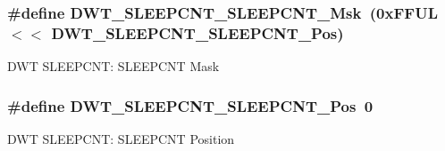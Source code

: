\subsubsection[{\texorpdfstring{D\+W\+T\+\_\+\+S\+L\+E\+E\+P\+C\+N\+T\+\_\+\+S\+L\+E\+E\+P\+C\+N\+T\+\_\+\+Msk}{DWT_SLEEPCNT_SLEEPCNT_Msk}}]{\setlength{\rightskip}{0pt plus 5cm}\#define D\+W\+T\+\_\+\+S\+L\+E\+E\+P\+C\+N\+T\+\_\+\+S\+L\+E\+E\+P\+C\+N\+T\+\_\+\+Msk~(0x\+F\+F\+U\+L $<$$<$ D\+W\+T\+\_\+\+S\+L\+E\+E\+P\+C\+N\+T\+\_\+\+S\+L\+E\+E\+P\+C\+N\+T\+\_\+\+Pos)}\hypertarget{group___c_m_s_i_s___d_w_t_ga1e340751d71413fef400a0a1d76cc828}{}\label{group___c_m_s_i_s___d_w_t_ga1e340751d71413fef400a0a1d76cc828}
D\+WT S\+L\+E\+E\+P\+C\+NT\+: S\+L\+E\+E\+P\+C\+NT Mask 
\subsubsection[{\texorpdfstring{D\+W\+T\+\_\+\+S\+L\+E\+E\+P\+C\+N\+T\+\_\+\+S\+L\+E\+E\+P\+C\+N\+T\+\_\+\+Pos}{DWT_SLEEPCNT_SLEEPCNT_Pos}}]{\setlength{\rightskip}{0pt plus 5cm}\#define D\+W\+T\+\_\+\+S\+L\+E\+E\+P\+C\+N\+T\+\_\+\+S\+L\+E\+E\+P\+C\+N\+T\+\_\+\+Pos~0}\hypertarget{group___c_m_s_i_s___d_w_t_ga0371a84a7996dc5852c56afb2676ba1c}{}\label{group___c_m_s_i_s___d_w_t_ga0371a84a7996dc5852c56afb2676ba1c}
D\+WT S\+L\+E\+E\+P\+C\+NT\+: S\+L\+E\+E\+P\+C\+NT Position 